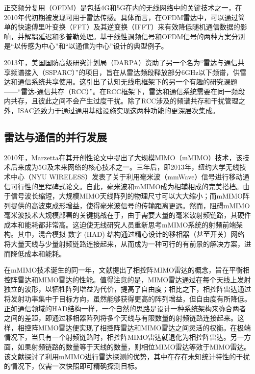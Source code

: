 正交频分复用（OFDM）是包括4G和5G在内的无线网络中的关键技术之一，在2010年代初期被发现可用于雷达传感。具体而言，在OFDM雷达中，可以通过简单的快速傅里叶变换（FFT）及其逆变换（IFFT）来有效降低随机通信数据的影响，并解耦延迟和多普勒处理。基于线性调频信号和OFDM信号的两种方案分别是“以传感为中心”和“以通信为中心”设计的典型例子。

2013年，美国国防高级研究计划局（DARPA）资助了另一个名为“雷达与通信共享频谱接入（SSPARC）”的项目，旨在从雷达频段释放部分6GHz以下频谱，供雷达和通信系统共享使用。这引出了认知无线电框架下的另一个有趣的研究课题——“雷达-通信共存（RCC）”。在RCC框架下，雷达和通信系统需要在同一频段内共存，且彼此之间不会产生过度干扰。除了RCC涉及的频谱共存和干扰管理之外，ISAC还致力于通过通用基础设施实现这两种功能的更深层次集成。

\subsection{雷达与通信的并行发展}

2010年，Marzetta在其开创性论文中提出了大规模MIMO（mMIMO）技术，该技术后来成为5G及未来网络的核心技术之一\cite{5595728}。三年后，即2013年，纽约大学无线技术中心（NYU WIRELESS）发表了关于利用毫米波（mmWave）信号进行移动通信可行性的里程碑式论文。自此，毫米波和mMIMO成为相辅相成的完美搭档。由于信号波长缩短，大规模MIMO天线阵列的物理尺寸可以大大缩小；而mMIMO阵列提供的高波束成形增益，使得毫米波信号的传输距离更远。然而，阻碍mMIMO毫米波技术大规模部署的关键挑战在于，由于需要大量的毫米波射频链路，其硬件成本和能耗都非常高。这迫使无线研究人员重新思考mMIMO系统的射频前端架构。其中，混合模拟-数字 (HAD) 结构通过精心设计的移相器（甚至开关）网络将大量天线与少量射频链路连接起来，从而成为一种可行的有前景的解决方案，进而降低成本和能耗。

在mMIMO技术诞生的同一年，文献\cite{5419124}提出了相控阵MIMO雷达的概念，旨在平衡相控阵雷达和MIMO雷达的性能。值得注意的是，MIMO雷达通过在每个天线上发射独立的波形，以牺牲阵列增益为代价，提高了自由度；相比之下，相控阵雷达通过将发射功率集中于目标方向，虽然能够获得更高的阵列增益，但自由度有所降低。正如通信领域的HAD结构一样，一个自然的思路是设计一种系统架构来弥合两者之间的差距，即通过移相器阵列将多个天线与有限数量的射频链路连接起来。这样，相控阵MIMO雷达便实现了相控阵雷达和MIMO雷达之间灵活的权衡\cite{5419124}。在极端情况下，当只有一个射频链路时，相控阵MIMO雷达就退化为相控阵雷达。另一方面，如果射频链路的数量等于天线的数量，则相位MIMO雷达等效于MIMO雷达。该文献探讨了利用mMIMO进行雷达探测的优势，其中在存在未知统计特性的干扰的情况下，仅需一次快照即可精确探测目标。

